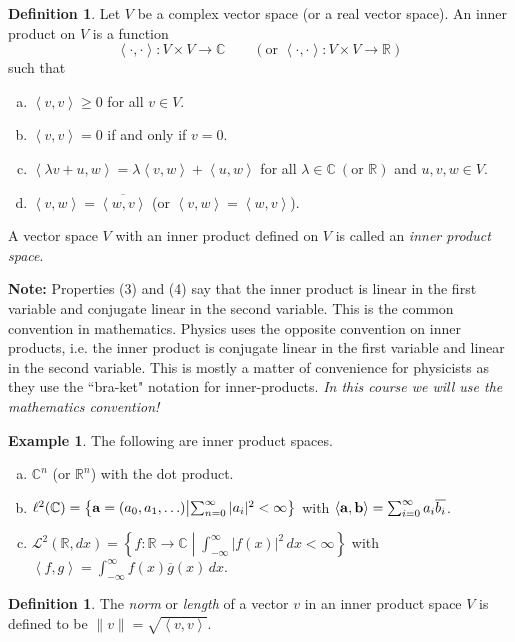 \documentclass[12pt,letterpaper]{article}
\newcommand{\ip}[2]{\left\langle {#1}, {#2}\right\rangle}
\theoremstyle{plain}
\theoremstyle{definition}
\newtheorem{definition}[theorem]{Definition}
\newtheorem{example}[theorem]{Example}
\numberwithin{equation}{section}
\begin{document}
\begin{definition}Let $V$ be a complex vector space (or a real vector space). An inner product on $V$ is a function 
\[\ip{\cdot}{\cdot}:V\times V\rightarrow \mathbb{C} \quad \quad(\text{or }\ip{\cdot}{\cdot}:V\times V\rightarrow \mathbb{R}) \]
such that 
\begin{enumerate}[(a)]
\item $\ip{v}{v}\geq 0$ for all $v\in V$. 
\item $\ip{v}{v}=0$ if and only if $v=0$. 
\item $\ip{\lambda v+u}{w}=\lambda\ip{v}{w}+\ip{u}{w}$ for all $\lambda \in \mathbb{C} \ (\text{or } \mathbb{R})$ and $u,v,w\in V$. 
\item $\ip{v}{w}=\overline{\ip{w}{v}}$ \quad \quad(or $\ip{v}{w}=\ip{w}{v}$).
\end{enumerate}
A vector space $V$ with an inner product defined on $V$ is called an \emph{inner product space}.
\end{definition}
{\bf \noindent Note: }Properties (3) and (4) say that the inner product is linear in the first variable and conjugate linear in the second variable. This is the common convention in mathematics. Physics uses the opposite convention on inner products, i.e. the inner product is conjugate linear in the first variable and linear in the second variable. This is mostly a matter of convenience for physicists as they use the ``bra-ket" notation for inner-products. \emph{{ In this course we will use the mathematics convention!}}

\begin{example}
The following are inner product spaces. 
\begin{enumerate}[(a)]
\item $\mathbb{C}^n$ (or $\mathbb{R}^n$) with the dot product. 
\item $\ell^2(\mathbb{C})=\left\{{\bf a}=(a_0, a_1, \ldots )\middle | \sum_{n=0}^\infty |a_i|^2<\infty \right\}$ with $\ip{{\bf a}}{{\bf b}}=\sum_{i=0}^\infty a_i\overline{b_i}$. 
\item $\mathcal{L}^2(\mathbb{R}, dx)=\left\{ f:\mathbb{R}\rightarrow \mathbb{C} \middle | \int_{-\infty}^\infty |f(x)|^2\, dx<\infty \right\}$ with $\ip{f}{g}=\int_{-\infty}^\infty f(x)\overline{g}(x)\, dx$. 
\end{enumerate}
\end{example}

\begin{definition} The \emph{norm} or \emph{length} of a vector $v$ in an inner product space $V$ is defined to be $\|v\|=\sqrt{\ip{v}{v}}$.
\end{definition}
\end{document}

